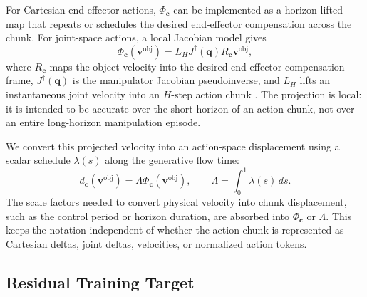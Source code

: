 \documentclass[10pt,twocolumn,letterpaper]{article}
\begin{document}
For Cartesian end-effector actions, $\Phi_{\mathbf c}$ can be implemented as a
horizon-lifted map that repeats or schedules the desired end-effector
compensation across the chunk. For joint-space actions, a local Jacobian model
gives
\begin{equation}
    \Phi_{\mathbf c}(\mathbf v^\text{obj})
    =
    L_H J^\dagger(\mathbf q) R_{\mathbf c}\mathbf v^\text{obj},
    \label{eq:kinematic_projection}
\end{equation}
where $R_{\mathbf c}$ maps the object velocity into the desired end-effector
compensation frame, $J^\dagger(\mathbf q)$ is the manipulator Jacobian
pseudoinverse, and $L_H$ lifts an instantaneous joint velocity into an
$H$-step action chunk \citep{nakamura1991advanced,siciliano2009robotics}. The
projection is local: it is intended to be accurate over the short horizon of an
action chunk, not over an entire long-horizon manipulation episode.

We convert this projected velocity into an action-space displacement using a
scalar schedule $\lambda(s)$ along the generative flow time:
\begin{equation}
    d_{\mathbf c}(\mathbf v^\text{obj})
    =
    \Lambda \Phi_{\mathbf c}(\mathbf v^\text{obj}),
    \qquad
    \Lambda=\int_0^1 \lambda(s)\,ds .
    \label{eq:integrated_velocity_displacement}
\end{equation}
The scale factors needed to convert physical velocity into chunk displacement,
such as the control period or horizon duration, are absorbed into
$\Phi_{\mathbf c}$ or $\Lambda$. This keeps the notation independent of whether
the action chunk is represented as Cartesian deltas, joint deltas, velocities,
or normalized action tokens.

\subsection{Residual Training Target}
\label{subsec:residual_target}
\end{document}
